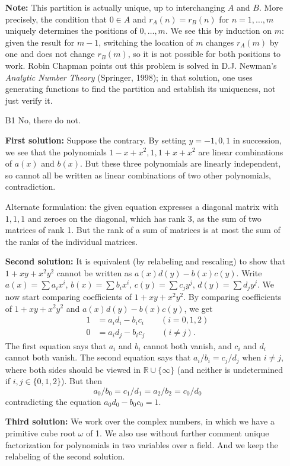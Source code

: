 \documentclass[amssymb,twocolumn,pra,10pt,aps]{revtex4-1}
\newcommand{\RR}{\mathbb{R}}
\begin{document}
\begin{itemize}
\textbf{Note:}
This partition is actually unique, up to interchanging $A$ and $B$.
More precisely, the condition that $0 \in A$ and $r_A(n) = r_B(n)$ for
$n=1, \dots, m$ uniquely determines the positions of $0, \dots, m$. We
see this by induction on $m$: given the result for $m-1$, switching the
location of $m$ changes $r_A(m)$ by one and does not change $r_B(m)$, so
it is not possible for both positions to work.  Robin Chapman points out
this problem is solved in D.J. Newman's \textit{Analytic Number Theory}
(Springer, 1998); in that solution, one uses generating functions to find
the partition and establish its uniqueness, not just verify it.

\item[B1]
No, there do not.

\textbf{First solution:}
Suppose the contrary.  By setting $y=-1,0,1$ in succession, we see that
the polynomials $1-x+x^2, 1, 1+x+x^2$ are linear combinations of $a(x)$
and $b(x)$.  But these three polynomials are linearly independent, so
cannot all be written as linear combinations of two other polynomials,
contradiction.

Alternate formulation: the given equation expresses a diagonal matrix with
$1,1,1$ and zeroes on the diagonal, which has rank 3, as the sum of two
matrices of rank 1. But the rank of a sum of matrices is at most the sum
of the ranks of the individual matrices.

\textbf{Second solution:}
It is equivalent (by relabeling and rescaling)
to show that $1 + xy + x^2y^2$ cannot be written
as $a(x) d(y) - b(x) c(y)$.
Write $a(x) = \sum a_i x^i$,
$b(x) = \sum b_i x^i$, $c(y) = \sum c_j y^j$,
$d(y) = \sum d_j y^j$. We now start comparing coefficients
of $1 + xy + x^2 y^2$. By comparing coefficients of
$1+xy + x^2y^2 $ and $a(x)d(y) - b(x)c(y)$, we get
\begin{align*}
1 &= a_id_i - b_i c_i \qquad (i=0,1,2)\\
0 &= a_id_j - b_i c_j \qquad (i \neq j).
\end{align*}
The first equation says that $a_i$ and $b_i$ cannot both vanish,
and $c_i$ and $d_i$ cannot both vanish. The second equation says that
$a_i/b_i = c_j/d_j$ when $i \neq j$, where both sides should be viewed
in $\RR \cup \{\infty\}$ (and neither is undetermined if
$i,j \in \{0,1,2\}$). But then
\[
a_0/b_0 = c_1/d_1 = a_2/b_2 = c_0/d_0
\]
contradicting the equation $a_0d_0 - b_0c_0 = 1$.

\textbf{Third solution:}
We work over the complex numbers, in which we have a primitive cube root
$\omega$ of 1. We also use without further comment unique factorization
for polynomials in two variables over a field.  And we keep the relabeling
of the second solution.


\end{itemize}
\end{document}
